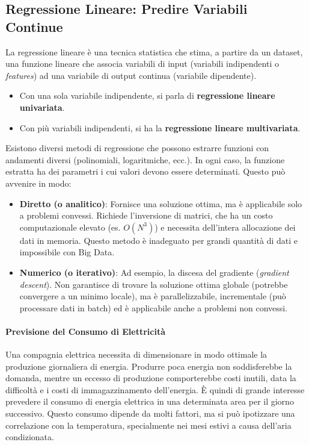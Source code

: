 \documentclass{article}
\begin{document}
\subsection{Regressione Lineare: Predire Variabili Continue}
La regressione lineare è una tecnica statistica che stima, a partire da un dataset, una funzione lineare che associa variabili di input (variabili indipendenti o \textit{features}) ad una variabile di output continua (variabile dipendente).
\begin{itemize}
    \item Con una sola variabile indipendente, si parla di \textbf{regressione lineare univariata}.
    \item Con più variabili indipendenti, si ha la \textbf{regressione lineare multivariata}.
\end{itemize}
Esistono diversi metodi di regressione che possono estrarre funzioni con andamenti diversi (polinomiali, logaritmiche, ecc.). In ogni caso, la funzione estratta ha dei parametri i cui valori devono essere determinati. Questo può avvenire in modo:
\begin{itemize}
    \item \textbf{Diretto (o analitico)}: Fornisce una soluzione ottima, ma è applicabile solo a problemi convessi. Richiede l'inversione di matrici, che ha un costo computazionale elevato (es. $O(N^3)$) e necessita dell'intera allocazione dei dati in memoria. Questo metodo è inadeguato per grandi quantità di dati e impossibile con Big Data.
    \item \textbf{Numerico (o iterativo)}: Ad esempio, la discesa del gradiente (\textit{gradient descent}). Non garantisce di trovare la soluzione ottima globale (potrebbe convergere a un minimo locale), ma è parallelizzabile, incrementale (può processare dati in batch) ed è applicabile anche a problemi non convessi.
\end{itemize}

\paragraph{Previsione del Consumo di Elettricità} Una compagnia elettrica necessita di dimensionare in modo ottimale la produzione giornaliera di energia. Produrre poca energia non soddisferebbe la domanda, mentre un eccesso di produzione comporterebbe costi inutili, data la difficoltà e i costi di immagazzinamento dell'energia. È quindi di grande interesse prevedere il consumo di energia elettrica in una determinata area per il giorno successivo. Questo consumo dipende da molti fattori, ma si può ipotizzare una correlazione con la temperatura, specialmente nei mesi estivi a causa dell'aria condizionata.
\end{document}
